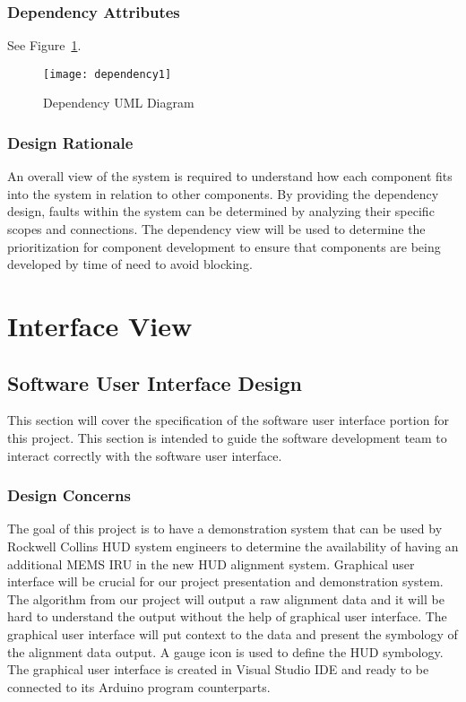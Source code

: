 		\subsubsection{Dependency Attributes}
		See Figure~\ref{fig:dependency1}.\\

		\begin{figure}
			\centering
		 		\caption{Dependency UML Diagram}			%
		      	\texttt{[image: dependency1]}
		    \label{fig:dependency1}
		\end{figure}

		\subsubsection{Design Rationale}
		An overall view of the system is required to understand how each component fits into the system in relation to other components. By providing the dependency design, faults within the system can be determined by analyzing their specific scopes and connections. The dependency view will be used to determine the prioritization for component development to ensure that components are being developed by time of need to avoid blocking.


\section{Interface View}
	\subsection{Software User Interface Design}
	This section will cover the specification of the software user interface portion for this project. This section is intended to guide the software development team to interact correctly with the software user interface.\\

		\subsubsection{Design Concerns}
		The goal of this project is to have a demonstration system that can be used by Rockwell Collins HUD system engineers to determine the availability of having an additional MEMS IRU in the new HUD alignment system. Graphical user interface will be crucial for our project presentation and demonstration system. The algorithm from our project will output a raw alignment data and it will be hard to understand the output without the help of graphical user interface. The graphical user interface will put context to the data and present the symbology of the alignment data output. A gauge icon is used to define the HUD symbology. The graphical user interface is created in Visual Studio IDE and ready to be connected to its Arduino program counterparts.\\

